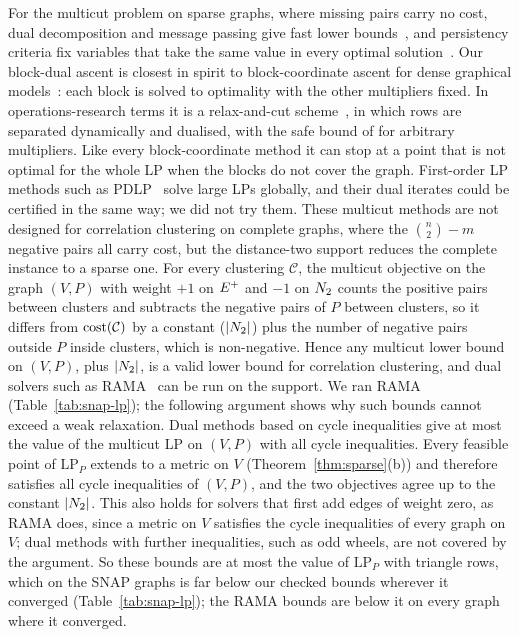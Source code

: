 For the multicut problem on sparse graphs, where missing pairs carry no cost,
dual decomposition and message passing give fast lower
bounds~\cite{SwobodaA17multicut,AbbasS22rama,abbas2023clusterfug}, and
persistency criteria fix variables that take the same value in every optimal
solution~\cite{lange2018partial,LangeAS19persistency}.  Our block-dual ascent
is closest in spirit to block-coordinate ascent for dense graphical
models~\cite{TouraniSRS18mplp}: each block is solved to optimality with the
other multipliers fixed.  In operations-research terms it is a relax-and-cut
scheme~\cite{Lucena05}, in which rows are separated dynamically and dualised,
with the safe bound of \citet{NeumaierS04safe} for arbitrary multipliers.
Like every block-coordinate method it can stop at a point that is not
optimal for the whole LP when the blocks do not cover the graph.  First-order
LP methods such as PDLP~\cite{ApplegateDHLLOS21pdlp} solve large LPs globally,
and their dual iterates could be certified in the same way; we did not try
them.  These multicut methods are not designed for correlation clustering on
complete graphs, where the $\binom n2-m$ negative pairs all carry cost, but
the distance-two support reduces the complete instance to a sparse one.  For
every clustering $\mathcal C$, the multicut objective on the graph $(V,P)$
with weight $+1$ on $E^{+}$ and $-1$ on $N_{2}$ counts the positive pairs between
clusters and subtracts the negative pairs of $P$ between clusters, so it
differs from $\mathrm{cost}(\mathcal C)$ by a constant ($|N_{2}|$) plus the number of
negative pairs outside $P$ inside clusters, which is non-negative.  Hence any
multicut lower bound on $(V,P)$, plus $|N_{2}|$, is a valid lower bound for
correlation clustering, and dual solvers such as RAMA~\cite{AbbasS22rama}
can be run on the support.  We ran RAMA (Table~\ref{tab:snap-lp}); the
following argument shows why such bounds cannot exceed a weak relaxation.
Dual methods based on cycle inequalities give at most the value of the
multicut LP on $(V,P)$ with all cycle inequalities.  Every feasible point of
$\mathrm{LP}_P$ extends to a metric on $V$ (Theorem~\ref{thm:sparse}(b)) and
therefore satisfies all cycle inequalities of $(V,P)$, and the two objectives
agree up to the constant $|N_{2}|$.  This also holds for solvers that first add edges of weight zero, as RAMA
does, since a metric on $V$ satisfies the cycle inequalities of every graph
on $V$; dual methods with further inequalities, such as odd wheels, are not
covered by the argument.  So these bounds are at most the value of
$\mathrm{LP}_P$ with triangle rows, which on the SNAP graphs is far below our
checked bounds wherever it converged (Table~\ref{tab:snap-lp}); the RAMA
bounds are below it on every graph where it converged.

